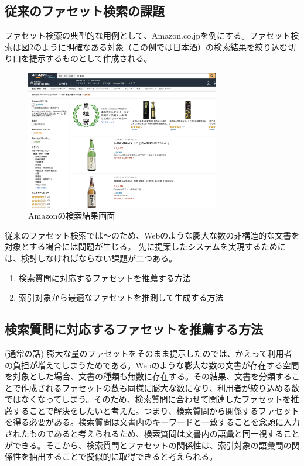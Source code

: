 \documentclass[a4j,11pt, twocolumn]{jarticle}
\begin{document}
\subsection{従来のファセット検索の課題}
 ファセット検索の典型的な用例として、Amazon.co.jp\cite{amazon}を例にする。ファセット検索は図2のように明確なある対象（この例では日本酒）の検索結果を絞り込む切り口を提示するものとして作成される。
 \begin{figure}[h]
   \includegraphics[width=85mm]{./amazon.png}
   \caption{Amazonの検索結果画面}
 \end{figure}
 従来のファセット検索では〜のため、Webのような膨大な数の非構造的な文書を対象とする場合には問題が生じる。
 先に提案したシステムを実現するためには、検討しなければならない課題が二つある。
\begin{enumerate}
  \item 検索質問に対応するファセットを推薦する方法
  \item 索引対象から最適なファセットを推測して生成する方法
\end{enumerate}

\subsection{検索質問に対応するファセットを推薦する方法}
 (通常の話)
 膨大な量のファセットをそのまま提示したのでは、かえって利用者の負担が増えてしまうためである。Webのような膨大な数の文書が存在する空間を対象とした場合、文書の種類も無数に存在する。その結果、文書を分類することで作成されるファセットの数も同様に膨大な数になり、利用者が絞り込める数ではなくなってしまう。そのため、検索質問に合わせて関連したファセットを推薦することで解決をしたいと考えた。つまり、検索質問から関係するファセットを得る必要がある。検索質問は文書内のキーワードと一致することを念頭に入力されたものであると考えられるため、検索質問は文書内の語彙と同一視することができる。そこから、検索質問とファセットの関係性は、索引対象の語彙間の関係性を抽出することで擬似的に取得できると考えられる。
\end{document}
